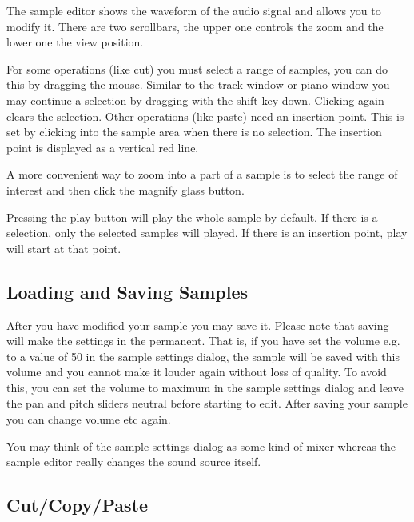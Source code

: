 \documentclass[letterpaper]{report}
\begin{document}
The sample editor shows the waveform of the audio signal and allows
you to modify it. There are two scrollbars, the upper one controls the
zoom and the lower one the view position.

For some operations (like cut) you must select a range of samples, you
can do this by dragging the mouse. Similar to the track window or piano
window you may continue a selection by dragging with the shift key down.
Clicking again clears the selection. Other operations (like paste) need
an insertion point. This is set by clicking into the sample area when
there is no selection. The insertion point is displayed as a vertical
red line.

A more convenient way to zoom into a part of a sample is to select
the range of interest and then click the magnify glass button.

Pressing the play button will play the whole sample by default. If there
is a selection, only the selected samples will played. If there is
an insertion point, play will start at that point.



\subsection{Loading and Saving Samples}

After you have modified your sample you may save it. Please note that
saving will make the settings in the  permanent. That is, if you have set the volume
e.g. to a value of 50 in the sample settings dialog, the sample will be
saved with this volume and you cannot make it louder again without loss
of quality. To avoid this, you can set the volume to maximum in the
sample settings dialog and leave the pan and pitch sliders neutral before
starting to edit. After saving your sample you can change volume etc again.

You may think of the sample settings dialog as some kind of mixer
whereas the sample editor really changes the sound source itself.

\subsection{Cut/Copy/Paste}
\end{document}

